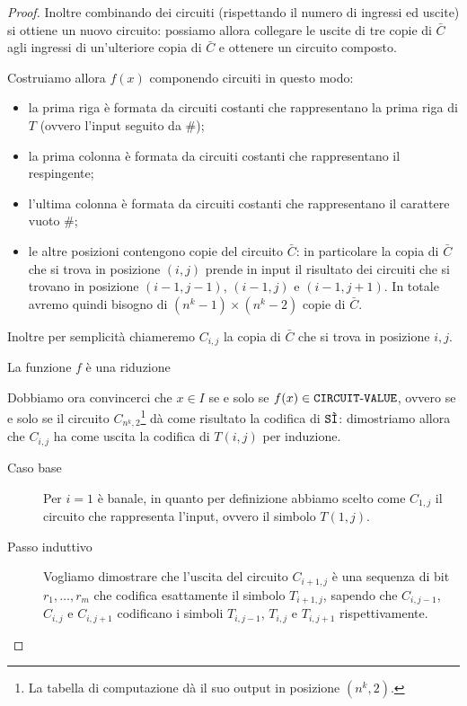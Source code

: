 \begin{proof}
  Inoltre combinando dei circuiti (rispettando il numero di 
  ingressi ed uscite) si ottiene un nuovo circuito: possiamo allora collegare
  le uscite di tre copie di $\bar C$ agli ingressi di un'ulteriore copia di
  $\bar C$ e ottenere un circuito composto. 
  
  Costruiamo allora $f(x)$ componendo circuiti in questo modo: \begin{itemize}
    \item la prima riga è formata da circuiti costanti che rappresentano la prima
      riga di $T$ (ovvero l'input seguito da $\#$);
    \item la prima colonna è formata da circuiti costanti che rappresentano il
      respingente;
    \item l'ultima colonna è formata da circuiti costanti che rappresentano il
      carattere vuoto $\#$;
    \item le altre posizioni contengono copie del circuito $\bar C$: in particolare
      la copia di $\bar C$ che si trova in posizione $(i, j)$ prende in input
      il risultato dei circuiti che si trovano in posizione $(i-1, j-1)$, $(i-1, j)$
      e $(i-1, j+1)$. In totale avremo quindi bisogno di
      $(n^{\!k} - 1) \times (n^{\!k} - 2)$ copie di $\bar C$.         
  \end{itemize} 
  Inoltre per semplicità chiameremo $C_{i, j}$ la copia di $\bar C$ che si trova
  in posizione $i, j$.   

  \medskip
  \textsf{\color{RoyalBlue} La funzione $f$ è una riduzione}

  Dobbiamo ora convincerci che $x \in I$ se e solo se $f(x) \in \CVAL$, ovvero
  se e solo se il circuito $C_{n^{\!k}, 2}$\footnote{La tabella di computazione dà
  il suo output in posizione $(n^{\!k}, 2)$.} dà come risultato la codifica 
  di $\SI$: dimostriamo allora che $C_{i, j}$ ha come uscita la codifica di $T(i, j)$
  per induzione.
  \begin{description}
    \item[Caso base] Per $i = 1$ è banale, in quanto per definizione abbiamo
      scelto come $C_{1, j}$ il circuito che rappresenta l'input,
      ovvero il simbolo $T(1, j)$. 
    \item[Passo induttivo] Vogliamo dimostrare che l'uscita del circuito
      $C_{i+1, j}$ è una sequenza di bit $r_1, \dots, r_m$ che codifica esattamente
      il simbolo $T_{i + 1, j}$, sapendo che $C_{i, j-1}$, $C_{i, j}$ e $C_{i, j+1}$
      codificano i simboli $T_{i, j-1}$, $T_{i, j}$ e $T_{i, j+1}$ rispettivamente.
      

\end{description}
\end{proof}
